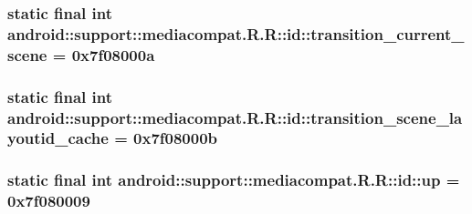 \hypertarget{classandroid_1_1support_1_1mediacompat_1_1_r_1_1id_c46c02f7f57182cf998a663ae8e7b7e9}{
\subsubsection[{transition\_\-current\_\-scene}]{\setlength{\rightskip}{0pt plus 5cm}static final int android::support::mediacompat.R.R::id::transition\_\-current\_\-scene = 0x7f08000a}}
\label{classandroid_1_1support_1_1mediacompat_1_1_r_1_1id_c46c02f7f57182cf998a663ae8e7b7e9}


\hypertarget{classandroid_1_1support_1_1mediacompat_1_1_r_1_1id_25dfb106b3f58c364086c2061d506f06}{
\subsubsection[{transition\_\-scene\_\-layoutid\_\-cache}]{\setlength{\rightskip}{0pt plus 5cm}static final int android::support::mediacompat.R.R::id::transition\_\-scene\_\-layoutid\_\-cache = 0x7f08000b}}
\label{classandroid_1_1support_1_1mediacompat_1_1_r_1_1id_25dfb106b3f58c364086c2061d506f06}


\hypertarget{classandroid_1_1support_1_1mediacompat_1_1_r_1_1id_4969b0be649fabcfc0921c421d34ffae}{
\subsubsection[{up}]{\setlength{\rightskip}{0pt plus 5cm}static final int android::support::mediacompat.R.R::id::up = 0x7f080009}}
\label{classandroid_1_1support_1_1mediacompat_1_1_r_1_1id_4969b0be649fabcfc0921c421d34ffae}


